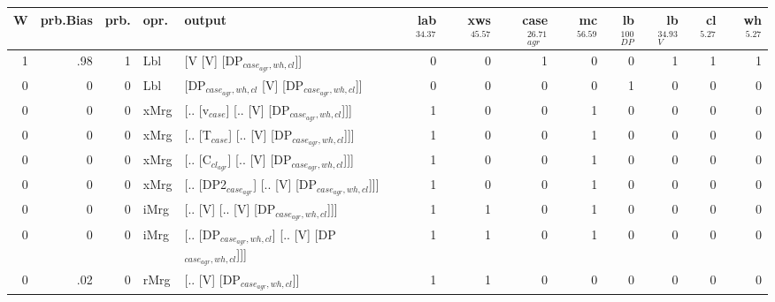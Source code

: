 \begin{tabularx}{\linewidth}{rrrlXrrrrrrrr}
\hline
   W &   prb.Bias &   prb. & opr.   & output                                                &   lab$^{34.37}$ &   xws$^{45.57}$ &   case$_{agr}^{26.71}$ &   mc$^{56.59}$ &   lb$_{DP}^{100}$ &   lb$_{V}^{34.93}$ &   cl$^{5.27}$ &   wh$^{5.27}$ \\
\hline
   1 &       .98 &   1 & Lbl  & [V [V] [DP$_{case_{agr},wh,cl}$]]                           &             0 &             0 &                  1 &            0 &                0 &              1 &        1 &        1 \\
   0 &       0 &   0 & Lbl  & [DP$_{case_{agr},wh,cl}$ [V] [DP$_{case_{agr},wh,cl}$]]           &             0 &             0 &                  0 &            0 &                1 &              0 &        0 &        0 \\
   0 &       0 &   0 & xMrg & [.. [v$_{case}$] [.. [V] [DP$_{case_{agr},wh,cl}$]]]            &             1 &             0 &                  0 &            1 &                0 &              0 &        0 &        0 \\
   0 &       0 &   0 & xMrg & [.. [T$_{case}$] [.. [V] [DP$_{case_{agr},wh,cl}$]]]            &             1 &             0 &                  0 &            1 &                0 &              0 &        0 &        0 \\
   0 &       0 &   0 & xMrg & [.. [C$_{cl_{agr}}$] [.. [V] [DP$_{case_{agr},wh,cl}$]]]          &             1 &             0 &                  0 &            1 &                0 &              0 &        0 &        0 \\
   0 &       0 &   0 & xMrg & [.. [DP2$_{case_{agr}}$] [.. [V] [DP$_{case_{agr},wh,cl}$]]]      &             1 &             0 &                  0 &            1 &                0 &              0 &        0 &        0 \\
   0 &       0 &   0 & iMrg & [.. [V] [.. [V] [DP$_{case_{agr},wh,cl}$]]]                 &             1 &             1 &                  0 &            1 &                0 &              0 &        0 &        0 \\
   0 &       0 &   0 & iMrg & [.. [DP$_{case_{agr},wh,cl}$] [.. [V] [DP$_{case_{agr},wh,cl}$]]] &             1 &             1 &                  0 &            1 &                0 &              0 &        0 &        0 \\
   0 &       .02 &   0 & rMrg & [.. [V] [DP$_{case_{agr},wh,cl}$]]                          &             1 &             1 &                  0 &            0 &                0 &              0 &        0 &        0 \\
\hline
\end{tabularx}\endgroup\\

